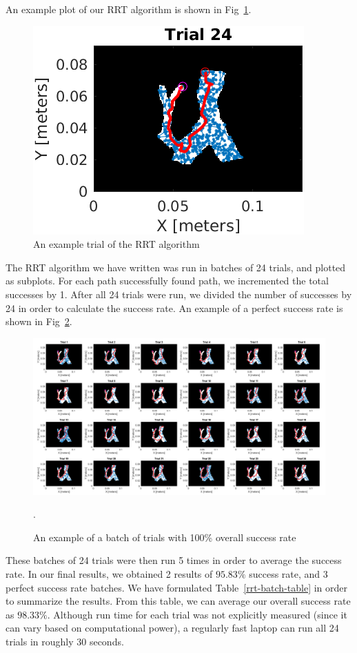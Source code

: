 \documentclass[conference]{IEEEtran}
\begin{document}
An example plot of our RRT algorithm is shown in Fig~\ref{trial24-fig}.

\begin{figure}[h]
    \centering
    \includegraphics[scale=0.85]{trial24.png}
    \caption{An example trial of the RRT algorithm}
    \label{trial24-fig}
\end{figure}

The RRT algorithm we have written was run in batches of 24 trials, and plotted as subplots.
For each path successfully found path, we incremented the total successes by 1. After all
24 trials were run, we divided the number of successes by 24 in order to calculate the
success rate. An example of a perfect success rate is shown in Fig~\ref{trial-batch-img}.

\begin{figure}[h]
    \centering
    \includegraphics[scale=0.21]{random-trials.png}
    \caption{An example of a batch of trials with 100\% overall success rate}
    \label{trial-batch-img}.
\end{figure}

These batches of 24 trials were then run 5 times in order to average the success rate. In
our final results, we obtained 2 results of $95.83\%$ success rate, and 3 perfect success
rate batches. We have formulated Table~\ref{rrt-batch-table} in order to summarize the results.
From this table, we can average our overall success rate as $98.33\%$. Although run time
for each trial was not explicitly measured (since it can vary based on computational power),
a regularly fast laptop can run all 24 trials in roughly 30 seconds.
\end{document}
